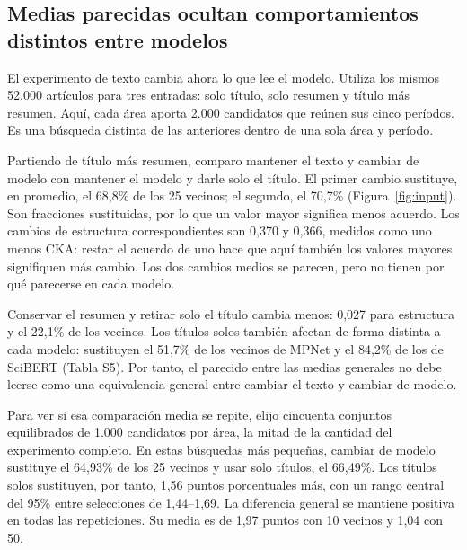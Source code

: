 \documentclass[12pt]{article}
\begin{document}
\FloatBarrier
\subsection{Medias parecidas ocultan comportamientos distintos entre modelos}
El experimento de texto cambia ahora lo que lee el modelo. Utiliza los mismos 52.000 artículos para tres entradas: solo título, solo resumen y título más resumen. Aquí, cada área aporta 2.000 candidatos que reúnen sus cinco períodos. Es una búsqueda distinta de las anteriores dentro de una sola área y período.

Partiendo de título más resumen, comparo mantener el texto y cambiar de modelo con mantener el modelo y darle solo el título. El primer cambio sustituye, en promedio, el 68,8\% de los 25 vecinos; el segundo, el 70,7\% (Figura~\ref{fig:input}). Son fracciones sustituidas, por lo que un valor mayor significa menos acuerdo. Los cambios de estructura correspondientes son 0,370 y 0,366, medidos como uno menos CKA: restar el acuerdo de uno hace que aquí también los valores mayores signifiquen más cambio. Los dos cambios medios se parecen, pero no tienen por qué parecerse en cada modelo.

Conservar el resumen y retirar solo el título cambia menos: 0,027 para estructura y el 22,1\% de los vecinos. Los títulos solos también afectan de forma distinta a cada modelo: sustituyen el 51,7\% de los vecinos de MPNet y el 84,2\% de los de SciBERT (Tabla S5). Por tanto, el parecido entre las medias generales no debe leerse como una equivalencia general entre cambiar el texto y cambiar de modelo.

Para ver si esa comparación media se repite, elijo cincuenta conjuntos equilibrados de 1.000 candidatos por área, la mitad de la cantidad del experimento completo. En estas búsquedas más pequeñas, cambiar de modelo sustituye el 64,93\% de los 25 vecinos y usar solo títulos, el 66,49\%. Los títulos solos sustituyen, por tanto, 1,56 puntos porcentuales más, con un rango central del 95\% entre selecciones de 1,44--1,69. La diferencia general se mantiene positiva en todas las repeticiones. Su media es de 1,97 puntos con 10 vecinos y 1,04 con 50.
\end{document}
